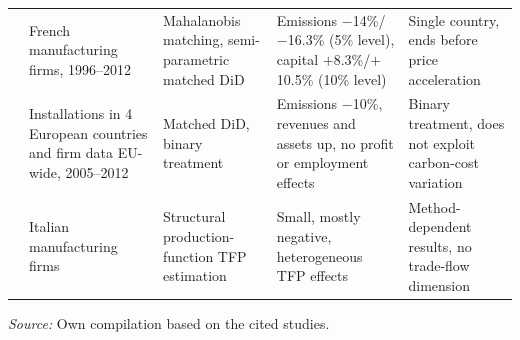 \begin{table}[htbp]
\begin{tabularx}{\textwidth}{>{\raggedright\arraybackslash}p{2.8cm} >{\raggedright\arraybackslash}p{2.5cm} >{\raggedright\arraybackslash}p{3.2cm} >{\raggedright\arraybackslash}p{2.8cm} >{\raggedright\arraybackslash}X}
\citet{colmer2025} & French manufacturing firms, 1996--2012 & Mahalanobis matching, semi-parametric matched DiD & Emissions $-$14\%/$-$16.3\% (5\% level), capital $+$8.3\%/$+$10.5\% (10\% level) & Single country, ends before price acceleration \\
\addlinespace
\citet{dechezlepretre2023} & Installations in 4 European countries and firm data EU-wide, 2005--2012 & Matched DiD, binary treatment & Emissions $-$10\%, revenues and assets up, no profit or employment effects & Binary treatment, does not exploit carbon-cost variation \\
\addlinespace
\citet{darcangelo2022} & Italian manufacturing firms & Structural production-function TFP estimation & Small, mostly negative, heterogeneous TFP effects & Method-dependent results, no trade-flow dimension \\
\bottomrule
\end{tabularx}
\vspace{0.3em}
\raggedright\footnotesize\textit{Source:} Own compilation based on the cited studies.
\end{table}

